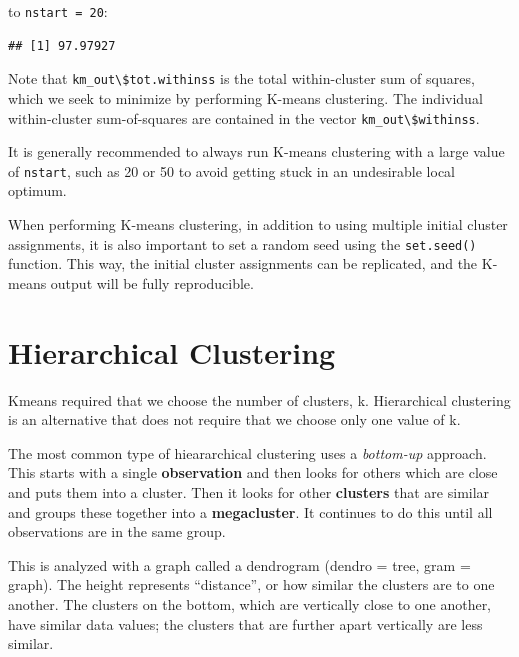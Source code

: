 \documentclass[openany]{book}
\newenvironment{Shaded}{\begin{snugshade}}{\end{snugshade}}
\newcommand{\DataTypeTok}[1]{\textcolor[rgb]{0.13,0.29,0.53}{#1}}
\newcommand{\DecValTok}[1]{\textcolor[rgb]{0.00,0.00,0.81}{#1}}
\newcommand{\KeywordTok}[1]{\textcolor[rgb]{0.13,0.29,0.53}{\textbf{#1}}}
\newcommand{\NormalTok}[1]{#1}
\newcommand{\OperatorTok}[1]{\textcolor[rgb]{0.81,0.36,0.00}{\textbf{#1}}}
\newcommand{\StringTok}[1]{\textcolor[rgb]{0.31,0.60,0.02}{#1}}
\begin{document}
to \texttt{nstart\ =\ 20}:

\begin{Shaded}
\end{Shaded}

\begin{verbatim}
## [1] 97.97927
\end{verbatim}

Note that \texttt{km\_out\textbackslash{}\$tot.withinss} is the total within-cluster sum of squares,
which we seek to minimize by performing K-means clustering. The individual within-cluster sum-of-squares are contained in the
vector \texttt{km\_out\textbackslash{}\$withinss}.

It is generally recommended to always run K-means clustering with a large
value of \texttt{nstart}, such as 20 or 50 to avoid getting stuck in an undesirable local
optimum.

When performing K-means clustering, in addition to using multiple initial
cluster assignments, it is also important to set a random seed using the
\texttt{set.seed()} function. This way, the initial cluster assignments can
be replicated, and the K-means output will be fully reproducible.

\hypertarget{hierarchical-clustering}{%
\section{Hierarchical Clustering}\label{hierarchical-clustering}}

Kmeans required that we choose the number of clusters, k. Hierarchical clustering is an alternative that does not require that we choose only one value of k.

The most common type of hieararchical clustering uses a \emph{bottom-up} approach. This starts with a single \textbf{observation} and then looks for others which are close and puts them into a cluster. Then it looks for other \textbf{clusters} that are similar and groups these together into a \textbf{megacluster}. It continues to do this until all observations are in the same group.

This is analyzed with a graph called a dendrogram (dendro = tree, gram = graph). The height represents ``distance'', or how similar the clusters are to one another. The clusters on the bottom, which are vertically close to one another, have similar data values; the clusters that are further apart vertically are less similar.
\end{document}
